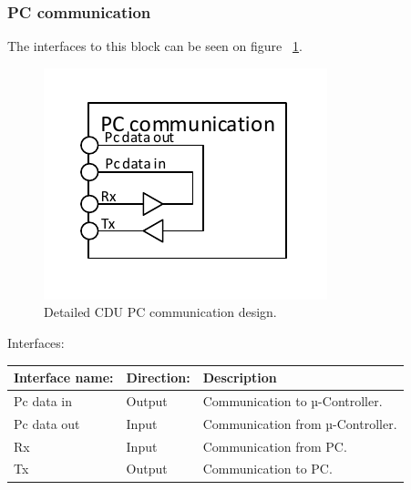 \subsubsection{PC communication}
The interfaces to this block can be seen on figure ~\ref{fig:CDUPCC}.\\
\begin{figure}[H]
	\centering
	\includegraphics[scale=1]{billeder/CDUPCC}
	\caption{Detailed CDU PC communication design.}
	\label{fig:CDUPCC}
\end{figure}
Interfaces:
\begin{table}[H]
	\centering
	\begin{tabular}{|p{3cm} |p{3cm}| p{8cm}| }
		\hline
		Interface name: & Direction: 	& Description \\ \hline
		Pc data in		&Output & Communication to µ-Controller. \\\hline 
		Pc data out		&Input & Communication from µ-Controller. \\\hline
		Rx		&Input & Communication from PC. \\\hline 
		Tx		&Output & Communication to PC. \\\hline
	\end{tabular}
\end{table}

